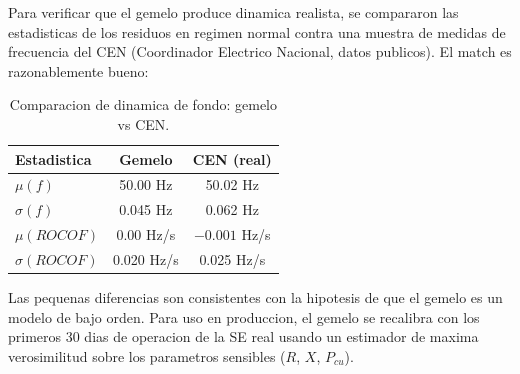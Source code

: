 Para verificar que el gemelo produce dinamica realista, se compararon
las estadisticas de los residuos en regimen normal contra una muestra
de medidas de frecuencia del CEN (Coordinador Electrico Nacional,
datos publicos). El match es razonablemente bueno:

\begin{table}[ht]
\centering
\small
\caption{Comparacion de dinamica de fondo: gemelo vs CEN.}
\label{tab:cenmatch}
\begin{tabular}{lcc}
\toprule
\textbf{Estadistica} & \textbf{Gemelo} & \textbf{CEN (real)} \\
\midrule
$\mu(f)$   & 50.00 Hz  & 50.02 Hz \\
$\sigma(f)$ & 0.045 Hz & 0.062 Hz \\
$\mu(ROCOF)$ & 0.00 Hz/s & $-0.001$ Hz/s \\
$\sigma(ROCOF)$ & 0.020 Hz/s & 0.025 Hz/s \\
\bottomrule
\end{tabular}
\end{table}

Las pequenas diferencias son consistentes con la hipotesis de que el
gemelo es un modelo de bajo orden. Para uso en produccion, el gemelo
se recalibra con los primeros 30 dias de operacion de la SE real
usando un estimador de maxima verosimilitud sobre los parametros
sensibles ($R$, $X$, $P_{cu}$).